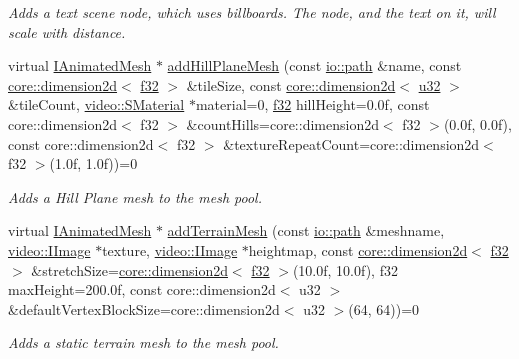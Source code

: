 \begin{DoxyCompactItemize}
\begin{DoxyCompactList}\small\item\em Adds a text scene node, which uses billboards. The node, and the text on it, will scale with distance. \end{DoxyCompactList}\item 
virtual \hyperlink{classirr_1_1scene_1_1IAnimatedMesh}{I\+Animated\+Mesh} $\ast$ \hyperlink{classirr_1_1scene_1_1ISceneManager_a2eb986c6975ebc1aa1f68c878ac8dcda}{add\+Hill\+Plane\+Mesh} (const \hyperlink{namespaceirr_1_1io_ab1bdc45edb3f94d8319c02bc0f840ee1}{io\+::path} \&name, const \hyperlink{classirr_1_1core_1_1dimension2d}{core\+::dimension2d}$<$ \hyperlink{namespaceirr_a0277be98d67dc26ff93b1a6a1d086b07}{f32} $>$ \&tile\+Size, const \hyperlink{classirr_1_1core_1_1dimension2d}{core\+::dimension2d}$<$ \hyperlink{namespaceirr_a0416a53257075833e7002efd0a18e804}{u32} $>$ \&tile\+Count, \hyperlink{classirr_1_1video_1_1SMaterial}{video\+::\+S\+Material} $\ast$material=0, \hyperlink{namespaceirr_a0277be98d67dc26ff93b1a6a1d086b07}{f32} hill\+Height=0.\+0f, const core\+::dimension2d$<$ f32 $>$ \&count\+Hills=core\+::dimension2d$<$ f32 $>$(0.\+0f, 0.\+0f), const core\+::dimension2d$<$ f32 $>$ \&texture\+Repeat\+Count=core\+::dimension2d$<$ f32 $>$(1.\+0f, 1.\+0f))=0
\begin{DoxyCompactList}\small\item\em Adds a Hill Plane mesh to the mesh pool. \end{DoxyCompactList}\item 
virtual \hyperlink{classirr_1_1scene_1_1IAnimatedMesh}{I\+Animated\+Mesh} $\ast$ \hyperlink{classirr_1_1scene_1_1ISceneManager_ac56c56d5ec02bfe7cfb35db7afc19b50}{add\+Terrain\+Mesh} (const \hyperlink{namespaceirr_1_1io_ab1bdc45edb3f94d8319c02bc0f840ee1}{io\+::path} \&meshname, \hyperlink{classirr_1_1video_1_1IImage}{video\+::\+I\+Image} $\ast$texture, \hyperlink{classirr_1_1video_1_1IImage}{video\+::\+I\+Image} $\ast$heightmap, const \hyperlink{classirr_1_1core_1_1dimension2d}{core\+::dimension2d}$<$ \hyperlink{namespaceirr_a0277be98d67dc26ff93b1a6a1d086b07}{f32} $>$ \&stretch\+Size=\hyperlink{classirr_1_1core_1_1dimension2d}{core\+::dimension2d}$<$ \hyperlink{namespaceirr_a0277be98d67dc26ff93b1a6a1d086b07}{f32} $>$(10.\+0f, 10.\+0f), f32 max\+Height=200.\+0f, const core\+::dimension2d$<$ u32 $>$ \&default\+Vertex\+Block\+Size=core\+::dimension2d$<$ u32 $>$(64, 64))=0
\begin{DoxyCompactList}\small\item\em Adds a static terrain mesh to the mesh pool. \end{DoxyCompactList}\item 

\end{DoxyCompactItemize}
